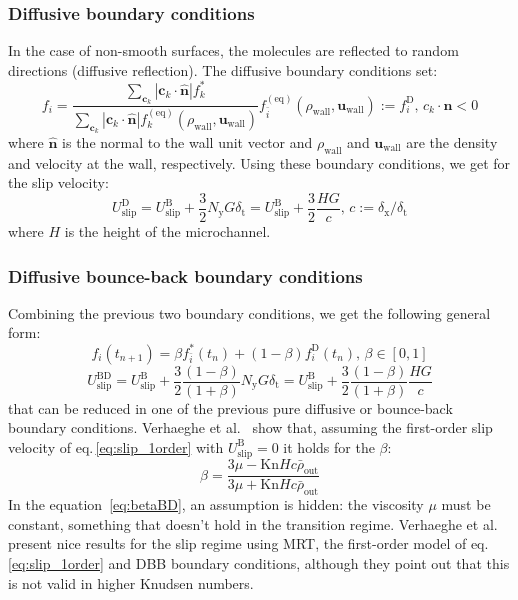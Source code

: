\subsubsection{Diffusive boundary conditions}
In the case of non-smooth surfaces, the molecules are reflected to random directions
(diffusive reflection). The diffusive boundary conditions set:
\begin{equation}
 f_i = \frac{\sum_{\mathbf{c}_k} | \mathbf{c}_k \cdot \hat{\mathbf{n}}| f_k^* }
 { \sum_{\mathbf{c}_k} | \mathbf{c}_k \cdot \hat{\mathbf{n}} | f_k^\mathrm{(eq)}(\rho_\mathrm{wall}, \mathbf{u}_\mathrm{wall})  }
 f_{\bar{i}}^{\mathrm{(eq)}}(\rho_\mathrm{wall}, \mathbf{u}_\mathrm{wall}) := f_i^\mathrm{D} \textrm{, \ } c_k \cdot \hat{\mathbf{n}} < 0
\end{equation}
where $\hat{\mathbf{n}}$ is the normal to the wall unit vector and $\rho_\mathrm{wall}$ and $\mathbf{u}_\mathrm{wall}$ are the density
and velocity at the wall, respectively. Using these boundary conditions, we get for the slip velocity:
\begin{equation}
 U_\mathrm{slip}^\mathrm{D} = U_\mathrm{slip}^\mathrm{B} + \frac{3}{2}N_\mathrm{y} G \delta_\mathrm{t} = U_\mathrm{slip}^\mathrm{B} + \frac{3}{2} \frac{H G}{c} \textrm{, \ } c:=\delta_\mathrm{x} / \delta_\mathrm{t}
\end{equation}
where $H$ is the height of the microchannel.

\subsubsection{Diffusive bounce-back boundary conditions}
Combining the previous two boundary conditions, we get the following general form:
\begin{equation}
 f_i(t_{n+1}) = \beta f_{\bar{i}}^{*} (t_n) + (1-\beta)f_i^\mathrm{D}(t_n) \textrm{, \ } \beta \in [0,1]
\end{equation}
\begin{equation}
 U_\mathrm{slip}^\mathrm{BD} = U_\mathrm{slip}^\mathrm{B} + \frac{3}{2} \frac{(1-\beta)}{(1+\beta)} N_\mathrm{y} G \delta_\mathrm{t}
 = U_\mathrm{slip}^\mathrm{B} + \frac{3}{2} \frac{(1-\beta)}{(1+\beta)} \frac{H G}{c}
\end{equation}
that can be reduced in one of the previous pure diffusive or bounce-back boundary conditions.
Verhaeghe et al.~\cite{Verhaeghe2009} show that, assuming the first-order slip velocity of eq.\,\ref{eq:slip_1order} with $U_\mathrm{slip}^\mathrm{B} = 0$ 
it holds for the $\beta$:
\begin{equation}
 \beta = \frac{3\mu - \mathrm{Kn} H c \bar{\rho}_\mathrm{out} }{3\mu + \mathrm{Kn} H c \bar{\rho}_\mathrm{out} }
 \label{eq:betaBD}
\end{equation}
In the equation~\ref{eq:betaBD}, an assumption is hidden: the viscosity $\mu$ must be constant, something that
doesn't hold in the transition regime. 
Verhaeghe et al. present nice results for the slip regime using MRT, the first-order model of eq.\,\ref{eq:slip_1order} and DBB boundary conditions, although
they point out that this is not valid in higher Knudsen numbers.

